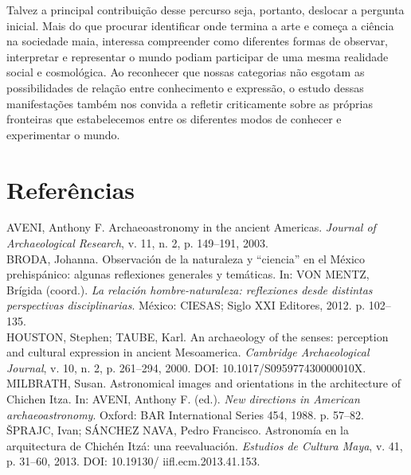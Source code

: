 \documentclass[11pt, a4paper]{article}
\begin{document}
Talvez a principal contribuição desse percurso seja, portanto, deslocar a pergunta inicial. Mais do que procurar identificar onde termina a arte e começa a ciência na sociedade maia, interessa compreender como diferentes formas de observar, interpretar e representar o mundo podiam participar de uma mesma realidade social e cosmológica. Ao reconhecer que nossas categorias não esgotam as possibilidades de relação entre conhecimento e expressão, o estudo dessas manifestações também nos convida a refletir criticamente sobre as próprias fronteiras que estabelecemos entre os diferentes modos de conhecer e experimentar o mundo.
\newpage
\section*{Referências}

\noindent
AVENI, Anthony F. Archaeoastronomy in the ancient Americas. \textit{Journal of Archaeological Research}, v. 11, n. 2, p. 149--191, 2003.\\

\noindent
BRODA, Johanna. Observación de la naturaleza y “ciencia” en el México prehispánico: algunas reflexiones generales y temáticas. In: VON MENTZ, Brígida (coord.). \textit{La relación hombre-naturaleza: reflexiones desde distintas perspectivas disciplinarias}. México: CIESAS; Siglo XXI Editores, 2012. p. 102--135.\\

\noindent
HOUSTON, Stephen; TAUBE, Karl. An archaeology of the senses: perception and cultural expression in ancient Mesoamerica. \textit{Cambridge Archaeological Journal}, v. 10, n. 2, p. 261--294, 2000. DOI: 10.1017/S095977430000010X.\\

\noindent
MILBRATH, Susan. Astronomical images and orientations in the architecture of Chichen Itza. In: AVENI, Anthony F. (ed.). \textit{New directions in American archaeoastronomy}. Oxford: BAR International Series 454, 1988. p. 57--82.\\

\noindent
ŠPRAJC, Ivan; SÁNCHEZ NAVA, Pedro Francisco. Astronomía en la arquitectura de Chichén Itzá: una reevaluación. \textit{Estudios de Cultura Maya}, v. 41, p. 31--60, 2013. DOI: 10.19130/ iifl.ecm.2013.41.153.\\
\end{document}

